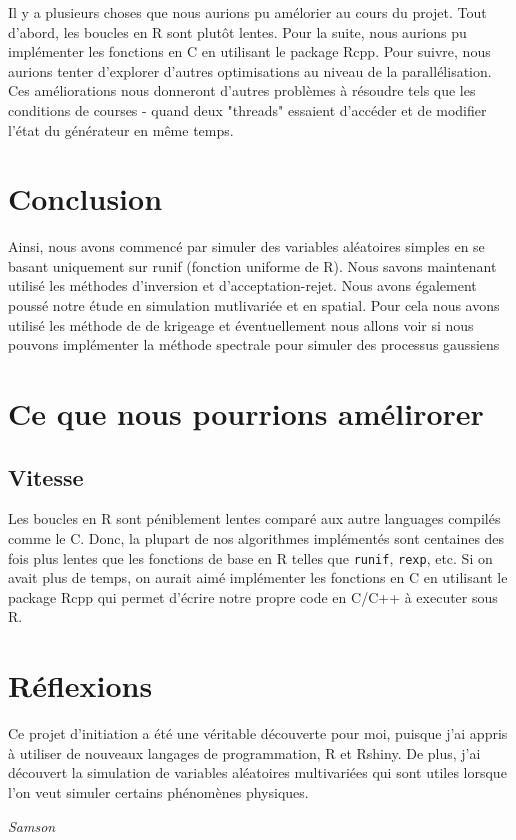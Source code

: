 \documentclass[10pt]{article} %
\begin{document}
Il y a plusieurs choses que nous aurions pu amélorier au cours du projet.
Tout d'abord, les boucles en R sont plutôt lentes. Pour la suite, nous aurions pu implémenter les fonctions en C en utilisant le package Rcpp. Pour suivre, nous aurions tenter d'explorer d'autres optimisations au niveau de la parallélisation. Ces améliorations nous donneront d'autres problèmes à résoudre tels que les conditions de courses - quand deux "threads" essaient d'accéder et
de modifier l'état du générateur en même temps.

\section{Conclusion}

Ainsi, nous avons commencé par simuler des variables aléatoires simples en se basant
uniquement sur runif (fonction uniforme de R). Nous savons maintenant utilisé les méthodes
 d'inversion et d'acceptation-rejet. Nous avons également poussé notre étude en simulation
 mutlivariée et en spatial. Pour cela nous avons utilisé les méthode de de krigeage et éventuellement
 nous allons voir si nous pouvons implémenter la méthode spectrale pour simuler des processus gaussiens

\section{Ce que nous pourrions amélirorer}
\subsection{Vitesse}

Les boucles en R sont péniblement lentes comparé aux autre languages compilés comme le C. Donc, la plupart de nos algorithmes implémentés sont
centaines des fois plus lentes que les fonctions de base en R telles que \texttt{runif}, \texttt{rexp}, etc. Si on avait plus de temps,
on aurait aimé implémenter les fonctions en C en utilisant le package Rcpp qui permet d'écrire notre propre code en C/C++ à executer sous R.
\section{Réflexions}

\renewcommand {\epigraphflush} {flushleft}
\epigraph{Ce projet d'initiation a été une véritable découverte pour moi, puisque j'ai appris à
 utiliser de nouveaux langages de programmation, R et Rshiny. De plus, j'ai découvert la
  simulation de variables aléatoires multivariées qui sont utiles
lorsque l'on veut simuler certains phénomènes physiques.} {\textit{Samson}}
\end{document}

